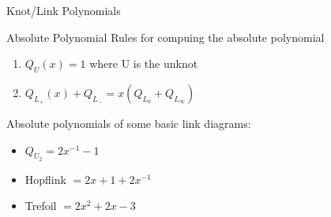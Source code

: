 \documentclass[12pt, letterpaper]{article}
\begin{document}
\begin{section}{Knot/Link Polynomials}
\begin{subsection}{Absolute Polynomial}
    Rules for compuing the absolute polynomial
    \begin{enumerate}
      \item \(Q_{U}(x) = 1\) where U is the unknot
      \item \(Q_{L_{+}}(x) + Q_{L_{-}} = x(Q_{L_{0}} + Q_{L_{\infty}})\)
    \end{enumerate}

    Absolute polynomials of some basic link diagrams:
    \begin{itemize}
      \item \(Q_{U_{2}} = 2x^{-1} - 1\)
      \item Hopflink \(= 2x + 1 + 2x^{-1}\)
      \item Trefoil \(= 2x^{2} + 2x - 3\)
    \end{itemize}
  \end{subsection}

\end{section}
\end{document}
